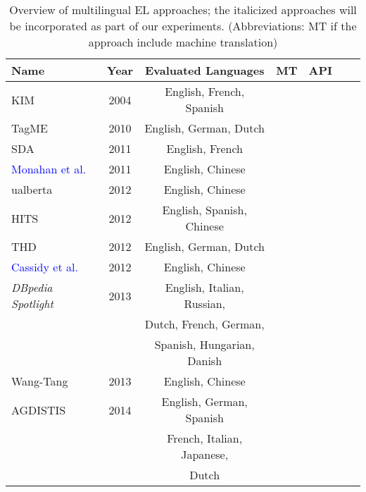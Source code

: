 \documentclass{llncs}
\newcommand{\cmark}{\ding{51}}%
\newcommand{\xmark}{}%
\begin{document}
\begin{table}[th!]
	\centering
	\caption{Overview of multilingual EL approaches; the italicized approaches will be incorporated as part of our experiments. (Abbreviations: MT if the approach include machine translation)}
	\label{tab:multilingual_approaches}
	\setlength{\tabcolsep}{3pt}
	\begin{tabular}{lcccccr}
		\toprule
		\textbf{Name} &  \textbf{Year} & \textbf{Evaluated Languages} & \textbf{MT} & \textbf{API}\\ \midrule
		
		KIM \cite{KIM-popov2004kim} & 2004 &English, French, Spanish&\xmark&\cmark\\\midrule
        
        TagME \cite{ferragina2010tagme} & 2010 & English, German, Dutch &\xmark&\cmark\\\midrule
		
		SDA \cite{SDA-charton2011automatic}  & 2011 &English, French&\xmark&\xmark\\\midrule
        
        \textcolor{blue}{Monahan et al.}~\cite{Monahan2011} & 2011 & English, Chinese&\cmark & \xmark\\\midrule 
		
		ualberta \cite{guo2012ualberta}& 2012 &English, Chinese&\xmark&\xmark\\\midrule
		
		HITS \cite{fahrni2012hits} & 2012 & English, Spanish, Chinese&\xmark&\xmark\\\midrule
		
		THD \cite{THD-dojchinovski2012recognizing}  & 2012 &English, German, Dutch&\xmark&\cmark\\\midrule 
        
        \textcolor{blue}{Cassidy et al.}~\cite{Cassidy2012} & 2012  &English, Chinese&\cmark \xmark\\\midrule 
		
		\textit{DBpedia Spotlight}~\cite{daiber2013improving} & 2013  &English, Italian, Russian,&\xmark&\cmark\\
		& &Dutch, French, German,&&&\\
		& &Spanish, Hungarian, Danish&&&\\\midrule
		
		Wang-Tang \cite{wang2013boosting} & 2013 & English, Chinese&\xmark&\xmark\\\midrule
		
		AGDISTIS \cite{mag2017}& 2014 & English, German, Spanish&\xmark&\cmark\\
		& &French, Italian, Japanese,&&&\\
		& &Dutch&&&\\\midrule
		

\end{tabular}
\end{table}
\end{document}
